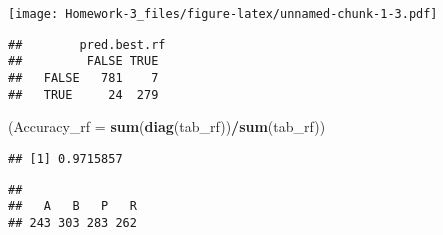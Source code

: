 \documentclass[]{article}
\newenvironment{Shaded}{\begin{snugshade}}{\end{snugshade}}
\newcommand{\CommentTok}[1]{\textcolor[rgb]{0.56,0.35,0.01}{\textit{#1}}}
\newcommand{\DataTypeTok}[1]{\textcolor[rgb]{0.13,0.29,0.53}{#1}}
\newcommand{\KeywordTok}[1]{\textcolor[rgb]{0.13,0.29,0.53}{\textbf{#1}}}
\newcommand{\NormalTok}[1]{#1}
\newcommand{\OperatorTok}[1]{\textcolor[rgb]{0.81,0.36,0.00}{\textbf{#1}}}
\begin{document}
\texttt{[image: Homework-3\_files/figure-latex/unnamed-chunk-1-3.pdf]}

\begin{Shaded}
\end{Shaded}

\begin{verbatim}
##        pred.best.rf
##         FALSE TRUE
##   FALSE   781    7
##   TRUE     24  279
\end{verbatim}

\begin{Shaded}
\begin{Highlighting}[]
\NormalTok{(}\DataTypeTok{Accuracy_rf =} \KeywordTok{sum}\NormalTok{(}\KeywordTok{diag}\NormalTok{(tab_rf))}\OperatorTok{/}\KeywordTok{sum}\NormalTok{(tab_rf))}
\end{Highlighting}
\end{Shaded}

\begin{verbatim}
## [1] 0.9715857
\end{verbatim}

\begin{Shaded}
\end{Shaded}

\begin{verbatim}
## 
##   A   B   P   R 
## 243 303 283 262
\end{verbatim}
\end{document}
